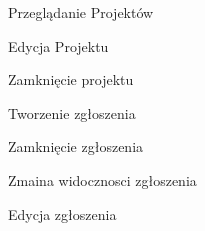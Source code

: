 \begin{sequence}{Przeglądanie Projektów}
\end{sequence}

\begin{sequence}{Edycja Projektu}
\end{sequence}

\begin{sequence}{Zamknięcie projektu}
\end{sequence}

\begin{sequence}{Tworzenie zgłoszenia}
\end{sequence}

\begin{sequence}{Zamknięcie zgłoszenia}
\end{sequence}

\begin{sequence}{Zmaina widocznosci zgłoszenia}
\end{sequence}

\begin{sequence}{Edycja zgłoszenia}
\end{sequence}


